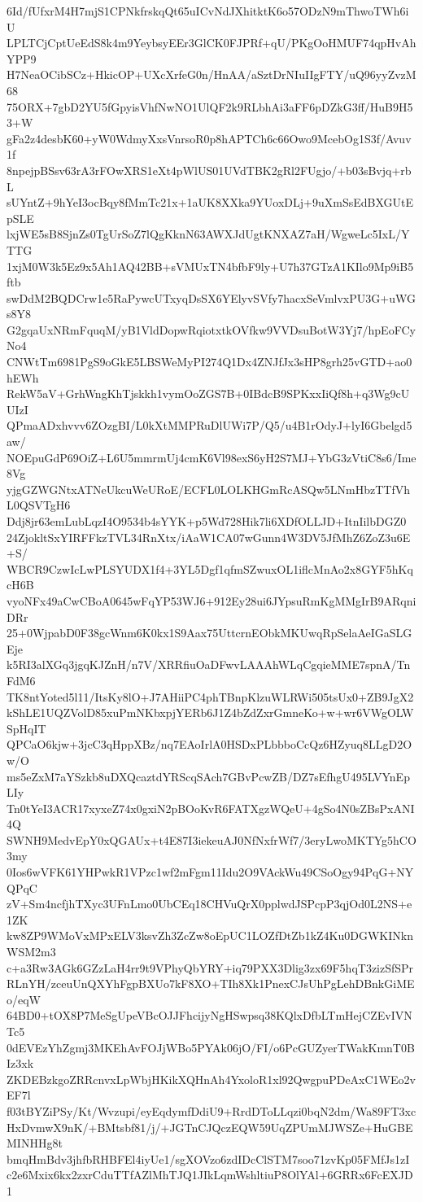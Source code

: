 6Id/fUfxrM4H7mjS1CPNkfrskqQt65uICvNdJXhitktK6o57ODzN9mThwoTWh6iU
LPLTCjCptUeEdS8k4m9YeybsyEEr3GlCK0FJPRf+qU/PKgOoHMUF74qpHvAhYPP9
H7NeaOCibSCz+HkicOP+UXcXrfeG0n/HnAA/aSztDrNIuIIgFTY/uQ96yyZvzM68
75ORX+7gbD2YU5fGpyisVhfNwNO1UlQF2k9RLbhAi3aFF6pDZkG3ff/HuB9H53+W
gFa2z4desbK60+yW0WdmyXxsVnrsoR0p8hAPTCh6c66Owo9McebOg1S3f/Avuv1f
8npejpBSsv63rA3rFOwXRS1eXt4pWlUS01UVdTBK2gRl2FUgjo/+b03sBvjq+rbL
sUYntZ+9hYeI3ocBqy8fMmTc21x+1aUK8XXka9YUoxDLj+9uXmSsEdBXGUtEpSLE
lxjWE5sB8SjnZs0TgUrSoZ7lQgKknN63AWXJdUgtKNXAZ7aH/WgweLc5IxL/YTTG
1xjM0W3k5Ez9x5Ah1AQ42BB+sVMUxTN4bfbF9ly+U7h37GTzA1KIlo9Mp9iB5ftb
swDdM2BQDCrw1e5RaPywcUTxyqDsSX6YElyvSVfy7hacxSeVmlvxPU3G+uWGs8Y8
G2gqaUxNRmFquqM/yB1VldDopwRqiotxtkOVfkw9VVDsuBotW3Yj7/hpEoFCyNo4
CNWtTm6981PgS9oGkE5LBSWeMyPI274Q1Dx4ZNJfJx3sHP8grh25vGTD+ao0hEWh
RekW5aV+GrhWngKhTjskkh1vymOoZGS7B+0IBdcB9SPKxxIiQf8h+q3Wg9cUUIzI
QPmaADxhvvv6ZOzgBI/L0kXtMMPRuDlUWi7P/Q5/u4B1rOdyJ+lyI6Gbelgd5aw/
NOEpuGdP69OiZ+L6U5mmrmUj4cmK6Vl98exS6yH2S7MJ+YbG3zVtiC8s6/Ime8Vg
yjgGZWGNtxATNeUkcuWeURoE/ECFL0LOLKHGmRcASQw5LNmHbzTTfVhL0QSVTgH6
Ddj8jr63emLubLqzI4O9534b4sYYK+p5Wd728Hik7li6XDfOLLJD+ItnIilbDGZ0
24ZjokltSxYIRFFkzTVL34RnXtx/iAaW1CA07wGunn4W3DV5JfMhZ6ZoZ3u6E+S/
WBCR9CzwIcLwPLSYUDX1f4+3YL5Dgf1qfmSZwuxOL1iflcMnAo2x8GYF5hKqcH6B
vyoNFx49aCwCBoA0645wFqYP53WJ6+912Ey28ui6JYpsuRmKgMMgIrB9ARqniDRr
25+0WjpabD0F38gcWnm6K0kx1S9Aax75UttcrnEObkMKUwqRpSelaAeIGaSLGEje
k5RI3alXGq3jgqKJZnH/n7V/XRRfiuOaDFwvLAAAhWLqCgqieMME7spnA/TnFdM6
TK8ntYoted5l11/ItsKy8lO+J7AHiiPC4phTBnpKlzuWLRWi505tsUx0+ZB9JgX2
kShLE1UQZVolD85xuPmNKbxpjYERb6J1Z4bZdZxrGmneKo+w+wr6VWgOLWSpHqIT
QPCaO6kjw+3jcC3qHppXBz/nq7EAoIrlA0HSDxPLbbboCcQz6HZyuq8LLgD2Ow/O
ms5eZxM7aYSzkb8uDXQcaztdYRScqSAch7GBvPcwZB/DZ7sEfhgU495LVYnEpLIy
Tn0tYeI3ACR17xyxeZ74x0gxiN2pBOoKvR6FATXgzWQeU+4gSo4N0sZBsPxANI4Q
SWNH9MedvEpY0xQGAUx+t4E87I3iekeuAJ0NfNxfrWf7/3eryLwoMKTYg5hCO3my
0Ios6wVFK61YHPwkR1VPzc1wf2mFgm11Idu2O9VAckWu49CSoOgy94PqG+NYQPqC
zV+Sm4ncfjhTXyc3UFnLmo0UbCEq18CHVuQrX0pplwdJSPcpP3qjOd0L2NS+e1ZK
kw8ZP9WMoVxMPxELV3ksvZh3ZcZw8oEpUC1LOZfDtZb1kZ4Ku0DGWKINknWSM2m3
c+a3Rw3AGk6GZzLaH4rr9t9VPhyQbYRY+iq79PXX3Dlig3zx69F5hqT3zizSfSPr
RLnYH/zceuUnQXYhFgpBXUo7kF8XO+TIh8Xk1PnexCJsUhPgLehDBnkGiMEo/eqW
64BD0+tOX8P7MeSgUpeVBcOJJFhcijyNgHSwpsq38KQlxDfbLTmHejCZEvIVNTc5
0dEVEzYhZgmj3MKEhAvFOJjWBo5PYAk06jO/FI/o6PcGUZyerTWakKmnT0BIz3xk
ZKDEBzkgoZRRcnvxLpWbjHKikXQHnAh4YxoloR1xl92QwgpuPDeAxC1WEo2vEF7l
f03tBYZiPSy/Kt/Wvzupi/eyEqdymfDdiU9+RrdDToLLqzi0bqN2dm/Wa89FT3xc
HxDvmwX9nK/+BMtsbf81/j/+JGTnCJQczEQW59UqZPUmMJWSZe+HuGBEMINHHg8t
bmqHmBdv3jhfbRHBFEl4iyUe1/sgXOVzo6zdIDcClSTM7soo71zvKp05FMfJs1zI
c2e6Mxix6kx2zxrCduTTfAZlMhTJQ1JIkLqmWshltiuP8OlYAl+6GRRx6FcEXJD1
